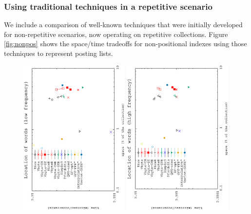 \documentclass[review]{elsarticle}
\begin{document}
\subsubsection{Using traditional techniques in a repetitive scenario} \label{exp:nopos:others}

We include a comparison of well-known techniques that were initially developed
for non-repetitive scenarios, now operating on repetitive collections.
Figure \ref{fig:nonpos} shows the space/time tradeoffs for 
non-positional indexes using those techniques to represent posting lists. 

\begin{figure}[t]
\begin{center}
\includegraphics[angle=-90,width=0.49\textwidth]{../figures/f1/words1-1000/nonpos-Wa.eps}
\includegraphics[angle=-90,width=0.49\textwidth]{../figures/f1/words1001-100k/nonpos-Wb.eps}

\end{center}
\end{figure}
\end{document}
